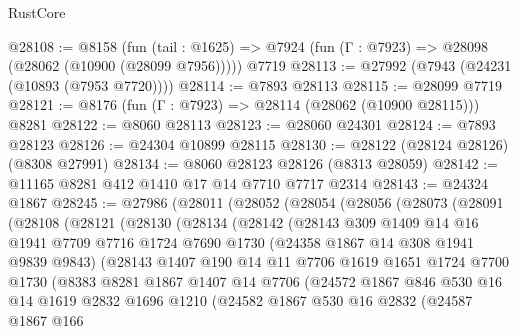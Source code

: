 \begin{lexlean}{RustCore}
\begin{coremodule}
@28108 := @8158
    (fun (tail : @1625) => @7924 (fun (Γ : @7923) => @28098 (@28062 (@10900 (@28099 @7956)))))
    @7719
@28113 := @27992 (@7943 (@24231 (@10893 (@7953 @7720))))
@28114 := @7893 @28113
@28115 := @28099 @7719
@28121 := @8176 (fun (Γ : @7923) => @28114 (@28062 (@10900 @28115))) @8281
@28122 := @8060 @28113
@28123 := @28060 @24301
@28124 := @7893 @28123
@28126 := @24304 @10899 @28115
@28130 := @28122 (@28124 @28126) (@8308 @27991)
@28134 := @8060 @28123 @28126 (@8313 @28059)
@28142 := @11165 @8281 @412 @1410 @17 @14 @7710 @7717 @2314
@28143 := @24324 @1867
@28245 := @27986
    (@28011
      (@28052
        (@28054
          (@28056
            (@28073
              (@28091
                (@28108
                  (@28121
                    (@28130
                      (@28134
                        (@28142
                          (@28143
                            @309
                            @1409
                            @14
                            @16
                            @1941
                            @7709
                            @7716
                            @1724
                            @7690
                            @1730
                            (@24358 @1867 @14 @308 @1941 @9839 @9843)
                            (@28143
                              @1407
                              @190
                              @14
                              @11
                              @7706
                              @1619
                              @1651
                              @1724
                              @7700
                              @1730
                              (@8383
                                @8281
                                @1867
                                @1407
                                @14
                                @7706
                                (@24572
                                  @1867
                                  @846
                                  @530
                                  @16
                                  @14
                                  @1619
                                  @2832
                                  @1696
                                  @1210
                                  (@24582
                                    @1867
                                    @530
                                    @16
                                    @2832
                                    (@24587
                                      @1867
                                      @166

\end{coremodule}
\end{lexlean}
